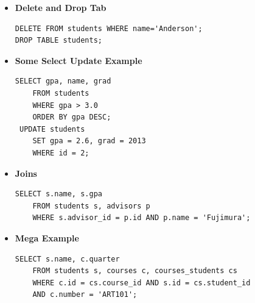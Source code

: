 \documentclass[10pt,landscape]{article}
\begin{document}
\begin{multicols}{2}
\begin{itemize}
\begin{verbatim}
\end{verbatim}
\item \textbf{Delete and Drop Tab}
\begin{verbatim}
DELETE FROM students WHERE name='Anderson';
DROP TABLE students;
\end{verbatim}
\item \textbf{Some Select Update Example}
\begin{verbatim}
SELECT gpa, name, grad
    FROM students
    WHERE gpa > 3.0
    ORDER BY gpa DESC;
 UPDATE students
    SET gpa = 2.6, grad = 2013
    WHERE id = 2;
\end{verbatim}
\item \textbf{Joins}
\begin{verbatim}
SELECT s.name, s.gpa
    FROM students s, advisors p
    WHERE s.advisor_id = p.id AND p.name = 'Fujimura';
\end{verbatim}
\item \textbf{Mega Example}
\begin{verbatim}
SELECT s.name, c.quarter
    FROM students s, courses c, courses_students cs
    WHERE c.id = cs.course_id AND s.id = cs.student_id
    AND c.number = 'ART101';
\end{verbatim}
\end{itemize}

\end{multicols}
\end{document}

